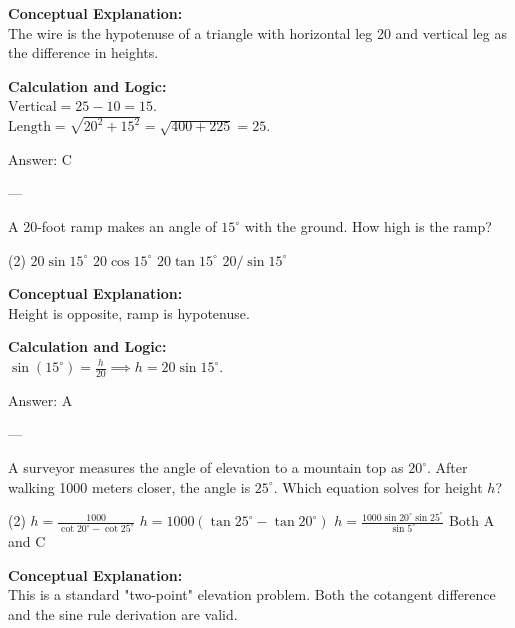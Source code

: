\documentclass[11pt,paper=a4,answers]{exam}
\begin{document}
\begin{questions}
\begin{solution}
\textbf{Conceptual Explanation:} \\
The wire is the hypotenuse of a triangle with horizontal leg 20 and vertical leg as the difference in heights.

\vspace{10pt}
\textbf{Calculation and Logic:} \\
$\text{Vertical} = 25 - 10 = 15$. \\
$\text{Length} = \sqrt{20^2 + 15^2} = \sqrt{400 + 225} = 25$.

\vspace{15pt}
Answer: \colorbox{yellow!100}{C}
\end{solution}

---

\question
A 20-foot ramp makes an angle of $15^\circ$ with the ground. How high is the ramp?
\begin{tasks}(2)
    \task $20 \sin 15^\circ$
    \task $20 \cos 15^\circ$
    \task $20 \tan 15^\circ$
    \task $20 / \sin 15^\circ$
\end{tasks}

\begin{solution}
\textbf{Conceptual Explanation:} \\
Height is opposite, ramp is hypotenuse.

\vspace{10pt}
\textbf{Calculation and Logic:} \\
$\sin(15^\circ) = \frac{h}{20} \implies h = 20 \sin 15^\circ$.

\vspace{15pt}
Answer: \colorbox{yellow!100}{A}
\end{solution}

---

\question
A surveyor measures the angle of elevation to a mountain top as $20^\circ$. After walking 1000 meters closer, the angle is $25^\circ$. Which equation solves for height $h$?
\begin{tasks}(2)
    \task $h = \frac{1000}{\cot 20^\circ - \cot 25^\circ}$
    \task $h = 1000(\tan 25^\circ - \tan 20^\circ)$
    \task $h = \frac{1000 \sin 20^\circ \sin 25^\circ}{\sin 5^\circ}$
    \task Both A and C
\end{tasks}

\begin{solution}
\textbf{Conceptual Explanation:} \\
This is a standard "two-point" elevation problem. Both the cotangent difference and the sine rule derivation are valid.


\end{solution}
\end{questions}
\end{document}
